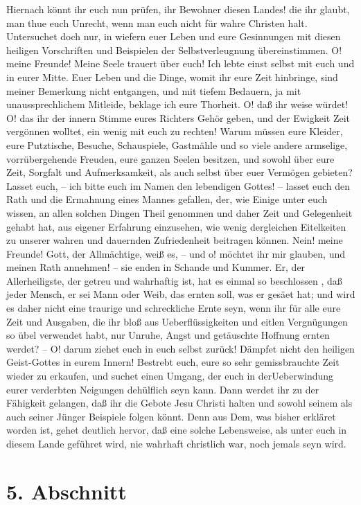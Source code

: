 Hiernach könnt ihr euch nun prüfen, ihr Bewohner diesen Landes! die ihr glaubt, man thue euch Unrecht, wenn man euch nicht für wahre Christen halt. Untersuchet doch nur, in wiefern euer Leben und eure Gesinnungen mit diesen heiligen Vorschriften und Beispielen der Selbstverleugnung übereinstimmen. O! meine Freunde! Meine Seele trauert über euch! Ich lebte einst selbst mit euch und in eurer Mitte. Euer Leben und die Dinge, womit ihr eure Zeit hinbringe, sind meiner Bemerkung nicht entgangen, und mit tiefem Bedauern, ja mit unaussprechlichem Mitleide, beklage ich eure Thorheit. O! daß ihr weise würdet! O! das ihr der innern Stimme eures Richters Gehör geben, und der Ewigkeit Zeit vergönnen wolltet, ein wenig mit euch zu rechten! Warum müssen eure Kleider, eure Putztische, Besuche, Schauspiele, Gastmähle und so viele andere armselige, vorrübergehende Freuden, eure ganzen Seelen besitzen, und sowohl über eure Zeit, Sorgfalt und Aufmerksamkeit, als auch selbst über euer Vermögen gebieten? Lasset euch, -- ich bitte euch im Namen den lebendigen Gottes! -- lasset euch den Rath und die Ermahnung eines Mannes gefallen, der, wie Einige unter euch wissen, an allen solchen Dingen Theil genommen und daher Zeit und Gelegenheit gehabt hat, aus eigener Erfahrung einzusehen, wie wenig dergleichen Eitelkeiten zu unserer wahren und dauernden Zufriedenheit beitragen können. Nein! meine Freunde! Gott, der Allmächtige, weiß es, -- und o! möchtet ihr mir glauben, und meinen Rath annehmen! -- sie enden in Schande und Kummer. Er, der Allerheiligste, der getreu und wahrhaftig ist, hat es einmal so beschlossen , daß jeder Mensch, er sei Mann oder Weib, das ernten soll, was er gesäet hat; und wird es daher nicht eine traurige und schreckliche Ernte seyn, wenn ihr für alle eure Zeit und Ausgaben, die ihr bloß aus Ueberflüssigkeiten und eitlen Vergnügungen so übel verwendet habt, nur Unruhe, Angst und getäuschte Hoffnung ernten werdet? -- O! darum ziehet euch in euch selbst zurück! Dämpfet nicht den heiligen Geist-Gottes in eurem Innern! Bestrebt  euch, eure so sehr gemissbrauchte Zeit wieder zu erkaufen, und suchet einen Umgang, der euch in derUeberwindung eurer verderbten Neigungen dehülflich seyn kann. Dann werdet ihr zu der Fähigkeit gelangen, daß ihr die Gebote Jesu Christi halten und sowohl seinem als auch seiner Jünger Beispiele folgen könnt. Denn aus Dem, was bisher erkläret worden ist, gehet deutlich hervor, daß eine solche Lebensweise, als unter euch in diesem Lande geführet wird, nie wahrhaft christlich war, noch jemals seyn wird.

\section{5. Abschnitt}

